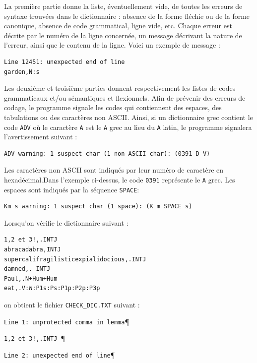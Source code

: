 \bigskip
\noindent La première partie donne la liste, éventuellement vide, de toutes les erreurs de syntaxe
trouvées dans le dictionnaire : absence de la forme fléchie ou de la forme canonique, absence
de code grammatical, ligne vide, etc. Chaque erreur est décrite par le numéro de la ligne
concernée, un message décrivant la nature de l’erreur, ainsi que le contenu de la ligne. Voici
un exemple de message :


\begin{verbatim}
Line 12451: unexpected end of line
garden,N:s
\end{verbatim}

\bigskip
\noindent Les deuxième et troisième parties donnent respectivement les listes de codes grammaticaux
et/ou sémantiques et flexionnels. Afin de prévenir des erreurs de codage, le programme signale les
codes qui contiennent des espaces, des tabulations ou des caractères non ASCII. Ainsi, si un
dictionnaire grec contient le code \verb+ADV+ où le caractère \verb+A+ est le \verb+A+ grec au lieu du \verb+A+ latin, le programme signalera l’avertissement suivant :

\begin{verbatim}
ADV warning: 1 suspect char (1 non ASCII char): (0391 D V)
\end{verbatim}

\bigskip
\noindent Les caractères non ASCII sont indiqués par leur numéro de caractère en hexadécimal.Dans
l’exemple ci-dessus, le code \verb+0391+ représente le \verb+A+ grec. Les espaces sont indiqués par
la séquence \verb+SPACE+:

\begin{verbatim}
Km s warning: 1 suspect char (1 space): (K m SPACE s)
\end{verbatim}

\bigskip
\noindent Lorsqu’on vérifie le dictionnaire suivant :

\begin{verbatim}
1,2 et 3!,.INTJ 
abracadabra,INTJ 
supercalifragilisticexpialidocious,.INTJ
damned,. INTJ
Paul,.N+Hum+Hum
eat,.V:W:P1s:Ps:P1p:P2p:P3p
\end{verbatim}

\bigskip
\noindent on obtient le fichier \verb+CHECK_DIC.TXT+ suivant :

\bigskip
\verb$Line 1: unprotected comma in lemma$\P

\verb$1,2 et 3!,.INTJ $\P

\verb$Line 2: unexpected end of line$\P

